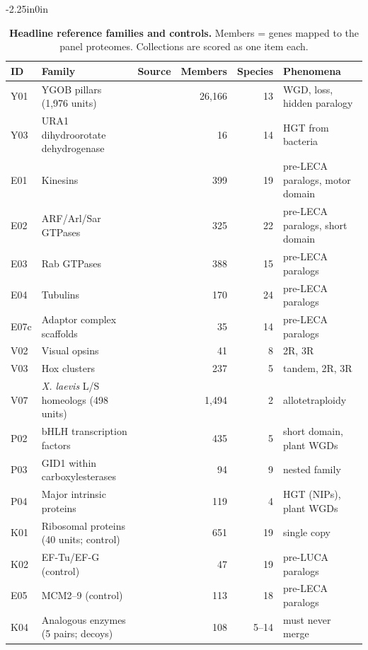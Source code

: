 \begin{table}[!ht]
\begin{adjustwidth}{-2.25in}{0in}
\centering
\caption{{\bf Headline reference families and controls.} Members = genes mapped to the panel proteomes. Collections are scored as one item each.}
\begin{tabular}{lllrrl}
\toprule
ID & Family & Source & Members & Species & Phenomena \\
\midrule
Y01 & YGOB pillars (1,976 units) & \cite{byrne2005ygob,scannell2007,marcethouben2015} & 26,166 & 13 & WGD, loss, hidden paralogy \\
Y03 & URA1 dihydroorotate dehydrogenase & \cite{hall2005ura1,gojkovic2004} & 16 & 14 & HGT from bacteria \\
E01 & Kinesins & \cite{wickstead2010kinesin} & 399 & 19 & pre-LECA paralogs, motor domain \\
E02 & ARF/Arl/Sar GTPases & \cite{vargova2021arf} & 325 & 22 & pre-LECA paralogs, short domain \\
E03 & Rab GTPases & \cite{klopper2012rab} & 388 & 15 & pre-LECA paralogs \\
E04 & Tubulins & \cite{findeisen2014tubulin} & 170 & 24 & pre-LECA paralogs \\
E07c & Adaptor complex scaffolds & \cite{hirst2014tset} & 35 & 14 & pre-LECA paralogs \\
V02 & Visual opsins & \cite{lagman2013opsins} & 41 & 8 & 2R, 3R \\
V03 & Hox clusters & \cite{holland2007homeobox,session2016xenopus} & 237 & 5 & tandem, 2R, 3R \\
V07 & \textit{X. laevis} L/S homeologs (498 units) & \cite{session2016xenopus} & 1,494 & 2 & allotetraploidy \\
P02 & bHLH transcription factors & \cite{pires2010bhlh} & 435 & 5 & short domain, plant WGDs \\
P03 & GID1 within carboxylesterases & \cite{yoshida2018gid1} & 94 & 9 & nested family \\
P04 & Major intrinsic proteins & \cite{danielson2008mips} & 119 & 4 & HGT (NIPs), plant WGDs \\
\midrule
K01 & Ribosomal proteins (40 units; control) & \cite{yutin2012rprot,galperin2021cog} & 651 & 19 & single copy \\
K02 & EF-Tu/EF-G (control) & \cite{baldauf1996,iwabe1989} & 47 & 19 & pre-LUCA paralogs \\
E05 & MCM2--9 (control) & \cite{liu2009mcm} & 113 & 18 & pre-LECA paralogs \\
K04 & Analogous enzymes (5 pairs; decoys) & \cite{omelchenko2010} & 108 & 5--14 & must never merge \\
\bottomrule
\end{tabular}
\label{tab2}
\end{adjustwidth}
\end{table}

